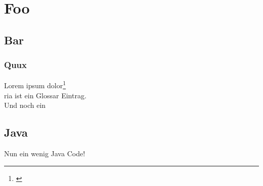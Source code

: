 \chapter{Foo}

\begin{intro}
	\Blindtext[1]
\end{intro}

	\section{Bar}
		\subsection{Quux}
Lorem ipsum dolor\footnote{\cite{Bischoff-2008}}\\
\gls{ria} ist ein Glossar Eintrag.\\
Und noch ein \\
\Blindtext[2][2]

	\section{Java}
	
Nun ein wenig Java Code!

%
%
